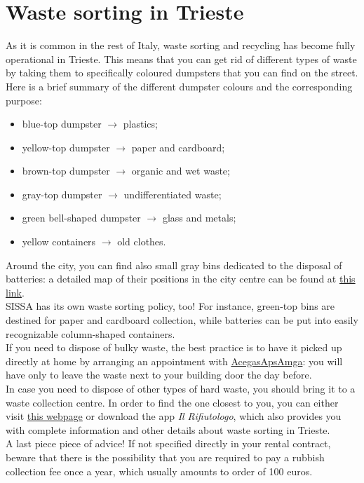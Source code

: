 \documentclass{sissavademecum}
\begin{document}
\section{Waste sorting in Trieste}

As it is common in the rest of Italy, waste sorting and recycling has become fully operational in Trieste. This means that you can get rid of different types of waste by taking them to specifically coloured dumpsters that you can find on the street. Here is a brief summary of the different dumpster colours and the corresponding purpose:
\begin{itemize}
    \item blue-top dumpster $\to$ plastics;
    \item yellow-top dumpster $\to$ paper and cardboard;
    \item brown-top dumpster $\to$ organic and wet waste;
    \item gray-top dumpster $\to$ undifferentiated waste;
    \item green bell-shaped dumpster $\to$ glass and metals;
    \item yellow containers $\to$ old clothes.
\end{itemize}
Around the city, you can find also small gray bins dedicated to the disposal of batteries: a detailed map of their positions in the city centre can be found at \href{http://wwftrieste.altervista.org/mappapile.shtml}{this link}. \\
SISSA has its own waste sorting policy, too! For instance, green-top bins are destined for paper and cardboard collection, while batteries can be put into easily recognizable column-shaped containers. \\
If you need to dispose of bulky waste, the best practice is to have it picked up directly at home by arranging an appointment with \href{https://www.acegasapsamga.it/clienti/casa/casa_servizio_ambiente/casa_aaa_ambiente_ritiro_ingombranti/32424.html}{AcegasApsAmga}: you will have only to leave the waste next to your building door the day before. \\
In case you need to dispose of other types of hard waste, you should bring it to a waste collection centre. In order to find the one closest to you, you can either visit \href{https://www.acegasapsamga.it/clienti/casa/casa_servizio_ambiente/casa_aaa_ambiente_centri_raccolta/32424.html}{this webpage} or download the app \textit{Il Rifiutologo}, which also provides you with complete information and other details about waste sorting in Trieste. \\
A last piece piece of advice! If not specified directly in your rental contract, beware that there is the possibility that you are required to pay a rubbish collection fee once a year, which usually amounts to order of 100 euros.
\end{document}
